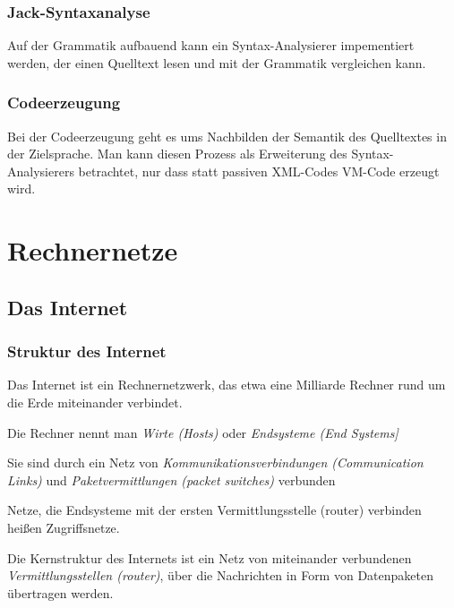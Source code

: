 \documentclass[12pt]{report}
\begin{document}
\subsection{Jack-Syntaxanalyse}
Auf der Grammatik aufbauend kann ein Syntax-Analysierer impementiert werden,
der einen Quelltext lesen und mit der Grammatik vergleichen kann.

\subsection{Codeerzeugung}
Bei der Codeerzeugung geht es ums Nachbilden der Semantik des Quelltextes in der Zielsprache.
Man kann diesen Prozess als Erweiterung des Syntax-Analysierers betrachtet, nur dass statt passiven XML-Codes VM-Code erzeugt wird.


\chapter{Rechnernetze}

\section{Das Internet}
\subsection{Struktur des Internet}
\begin{defbox}
  Das Internet ist ein Rechnernetzwerk, das etwa eine Milliarde Rechner rund um die Erde miteinander verbindet.

  Die Rechner nennt man \textit{Wirte (Hosts)} oder \textit{Endsysteme (End Systems]}

  Sie sind durch ein Netz von \textit{Kommunikationsverbindungen (Communication Links)} und \textit{Paketvermittlungen (packet switches)} verbunden
\end{defbox}

Netze, die Endsysteme mit der ersten Vermittlungsstelle (router) verbinden heißen Zugriffsnetze.


\begin{defbox}[Vermittlungsstellen]
  Die Kernstruktur des Internets ist ein Netz von miteinander verbundenen
  \textit{Vermittlungsstellen (router)}, über die Nachrichten in Form von Datenpaketen übertragen werden.
\end{defbox}
\end{document}

